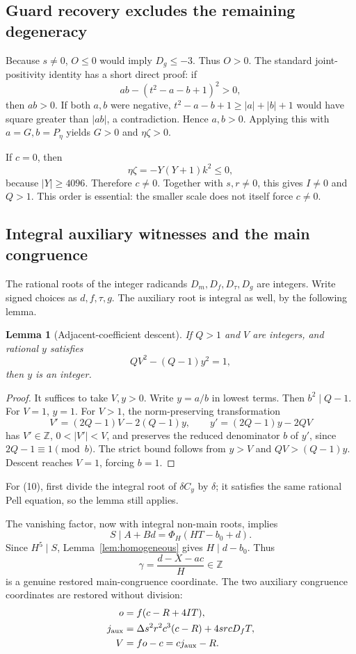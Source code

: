\documentclass[11pt,letterpaper]{article}
\newtheorem{lemma}[theorem]{Lemma}
\theoremstyle{definition}\newtheorem{definition}[theorem]{Definition}
\theoremstyle{remark}\newtheorem{remark}[theorem]{Remark}
\newcommand{\Z}{\mathbb Z}\newcommand{\N}{\mathbb N}\newcommand{\Q}{\mathbb Q}
\begin{document}
\subsection{Guard recovery excludes the remaining degeneracy}
Because $s\ne0$, $O\le0$ would imply $D_g\le-3$. Thus $O>0$. The standard joint-positivity identity has a short direct proof: if
\[
 ab-(t^2-a-b+1)^2>0,
\]
then $ab>0$. If both $a,b$ were negative, $t^2-a-b+1\ge|a|+|b|+1$ would have square greater than $|ab|$, a contradiction. Hence $a,b>0$. Applying this with $a=G,b=P_\eta$ yields $G>0$ and $\eta\zeta>0$.

If $c=0$, then
\[
 \eta\zeta=-Y(Y+1)k^2\le0,
\]
because $|Y|\ge4096$. Therefore $c\ne0$. Together with $s,r\ne0$, this gives $I\ne0$ and $Q>1$. This order is essential: the smaller scale does not itself force $c\ne0$.

\subsection{Integral auxiliary witnesses and the main congruence}
The rational roots of the integer radicands $D_m,D_f,D_\tau,D_g$ are integers. Write signed choices as $d,f,\tau,g$. The auxiliary root is integral as well, by the following lemma.

\begin{lemma}[Adjacent-coefficient descent]\label{lem:descent}
If $Q>1$ and $V$ are integers, and rational $y$ satisfies
\[
 QV^2-(Q-1)y^2=1,
\]
then $y$ is an integer.
\end{lemma}
\begin{proof}
It suffices to take $V,y>0$. Write $y=a/b$ in lowest terms. Then $b^2\mid Q-1$. For $V=1$, $y=1$. For $V>1$, the norm-preserving transformation
\[
 V'=(2Q-1)V-2(Q-1)y,\qquad
 y'=(2Q-1)y-2QV
\]
has $V'\in\Z$, $0<|V'|<V$, and preserves the reduced denominator $b$ of $y'$, since $2Q-1\equiv1\pmod b$. The strict bound follows from $y>V$ and $QV>(Q-1)y$. Descent reaches $V=1$, forcing $b=1$.
\end{proof}
For (10), first divide the integral root of $\delta C_y$ by $\delta$; it satisfies the same rational Pell equation, so the lemma still applies.

The vanishing factor, now with integral non-main roots, implies
\[
 S\mid A+Bd
 =\Phi_H(HT-b_0+d).
\]
Since $H^5\mid S$, Lemma~\ref{lem:homogeneous} gives $H\mid d-b_0$. Thus
\[
 \gamma=\frac{d-X-ac}{H}\in\Z
\]
is a genuine restored main-congruence coordinate. The two auxiliary congruence coordinates are restored without division:
\begin{align*}
 o&=f(c-R+4IT),\\
 j_{\rm aux}&=\Delta s^2r^2c^3(c-R)+4srcD_fT,\\
 V&=fo-c=cj_{\rm aux}-R.
\end{align*}
\end{document}
